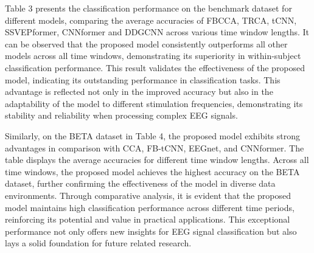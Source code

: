 \documentclass[10pt]{iopart}
\begin{document}
Table 3 presents the classification performance on the benchmark dataset for different models, comparing the average accuracies of FBCCA, TRCA, tCNN, SSVEPformer, CNNformer and DDGCNN across various time window lengths. It can be observed that the proposed model consistently outperforms all other models across all time windows, demonstrating its superiority in within-subject classification performance. This result validates the effectiveness of the proposed model, indicating its outstanding performance in classification tasks. This advantage is reflected not only in the improved accuracy but also in the adaptability of the model to different stimulation frequencies, demonstrating its stability and reliability when processing complex EEG signals.

Similarly, on the BETA dataset in Table 4, the proposed model exhibits strong advantages in comparison with CCA, FB-tCNN, EEGnet, and CNNformer. The table displays the average accuracies for different time window lengths. Across all time windows, the proposed model achieves the highest accuracy on the BETA dataset, further confirming the effectiveness of the model in diverse data environments. Through comparative analysis, it is evident that the proposed model maintains high classification performance across different time periods, reinforcing its potential and value in practical applications. This exceptional performance not only offers new insights for EEG signal classification but also lays a solid foundation for future related research.
\end{document}
